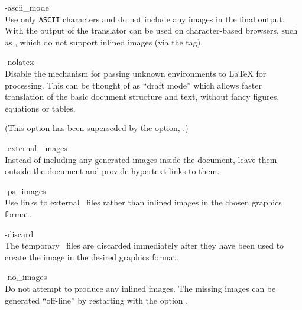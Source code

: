 \begin{htmllist}%
%
%
%
\item [ -ascii\_mode \label{cs_asciimode}]
\\
Use only \texttt{ASCII} characters and do not include any images in the final output.
With  the output of the translator can be used on
character-based browsers, such as ,
which do not support inlined images (via the  tag).


%
\item [ -nolatex \label{cs_nolatex}]
\\
Disable the mechanism for passing unknown environments to \LaTeX{} for processing.
This can be thought of as ``draft mode'' which allows
faster translation of the basic document structure and text,
without fancy figures, equations or tables.

(This option has been superseded by the  option,
.)


%
\item [ -external\_images\label{cs_extimages}]
\\
Instead of including any generated images inside the document,
leave them outside the document and provide hypertext links to them.


%
\item [ -ps\_images\label{cs_psimages}]
\\
Use links to external \PS\ files rather than inlined images
in the chosen graphics format.

%
\begin{changebar}
\item [ -discard\label{cs_discard}]
\\
The temporary \PS\ files are discarded immediately after they
have been used to create the image in the desired graphics format.
\end{changebar}

%
\item [ -no\_images\label{cs_noimages}]
\\
Do not attempt to produce any inlined images.
The missing images can be generated ``off-line'' by restarting \latextohtml{}
with the option .


\end{htmllist}
